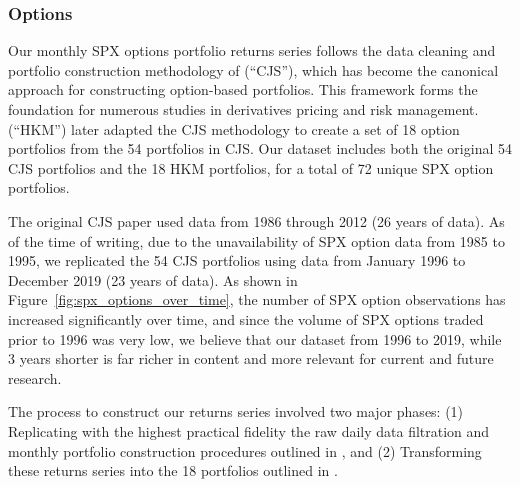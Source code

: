 \documentclass{article}
\begin{document}
\begin{appendices}
\subsubsection{Options}
\label{sec:options}

Our monthly SPX options portfolio returns series follows the data cleaning and portfolio construction methodology of \citet{Constantinides2013} (``CJS''), which has become the canonical approach for constructing option-based portfolios. This framework forms the foundation for numerous studies in derivatives pricing and risk management. \citet{He2017} (``HKM'') later adapted the CJS methodology to create a set of 18 option portfolios from the 54 portfolios in CJS. Our dataset includes both the original 54 CJS portfolios and the 18 HKM portfolios, for a total of 72 unique SPX option portfolios.

The original CJS paper used data from 1986 through 2012 (26 years of data). As of the time of writing, due to the unavailability of SPX option data from 1985 to 1995, we replicated the 54 CJS portfolios using data from January 1996 to December 2019 (23 years of data). As shown in Figure~\ref{fig:spx_options_over_time}, the number of SPX option observations has increased significantly over time, and since the volume of SPX options traded prior to 1996 was very low, we believe that our dataset from 1996 to 2019, while 3 years shorter is far richer in content and more relevant for current and future research.

The process to construct our returns series involved two major phases: (1) Replicating with the highest practical fidelity the raw daily data filtration and monthly portfolio construction procedures outlined in \citet{Constantinides2013}, and (2) Transforming these returns series into the 18 portfolios outlined in \citet{He2017}.


\end{appendices}
\end{document}
